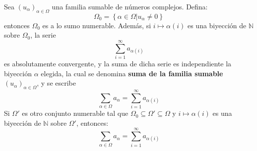 \documentclass[12pt]{report}
\theoremstyle{largebreak}
\begin{document}
    \begin{propo}
        Sea $\left(u_\alpha \right)_{\alpha\in\Omega}$ una familia sumable de números complejos. Defina:
        \begin{equation*}
            \Omega_0=\left\{\alpha\in\Omega\Big|u_\alpha\neq0 \right\}
        \end{equation*}
        entonces $\Omega_0$ es a lo sumo numerable. Además, si $i\mapsto\alpha(i)$ es una biyección de $\mathbb{N}$ sobre $\Omega_0$, la serie
        \begin{equation*}
            \sum_{i=1 }^{\infty}a_{\alpha(i)}
        \end{equation*}
        es absolutamente convergente, y la suma de dicha serie es independiente la biyección $\alpha$ elegida, la cual se denomina \textbf{suma de la familia sumable $\left(u_\alpha \right)_{\alpha\in\Omega}$}, y se escribe
        \begin{equation*}
            \sum_{\alpha\in\Omega }a_\alpha=\sum_{i=1 }^{\infty}a_{\alpha(i)}
        \end{equation*}
        Si $\Omega'$ es otro conjunto numerable tal que $\Omega_0\subseteq\Omega'\subseteq\Omega$ y $i\mapsto\alpha(i)$ es una biyección de $\mathbb{N}$ sobre $\Omega'$, entonces:
        \begin{equation*}
            \sum_{\alpha\in\Omega }a_\alpha=\sum_{i=1 }^{\infty}a_{\alpha(i)}
        \end{equation*}
    \end{propo}
\end{document}
